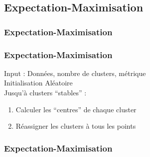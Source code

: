\subsection{Expectation-Maximisation}

\begin{frame}
  \frametitle{Expectation-Maximisation}
\end{frame}

\begin{frame}
  \frametitle{Expectation-Maximisation}
  Input : Données, nombre de clusters, métrique \\
  Initialisation Aléatoire \\
  Jusqu'à clusters ``stables'' :\\
  \begin{enumerate}
  \item Calculer les ``centres'' de chaque cluster
  \item Réassigner les clusters à tous les points
  \end{enumerate}
\end{frame}

\begin{frame}
  \frametitle{Expectation-Maximisation}
\end{frame}

